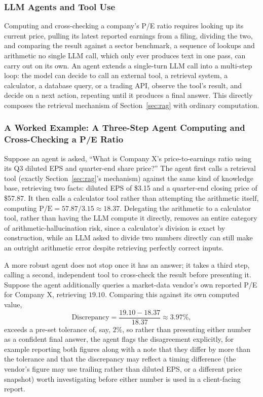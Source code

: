 \documentclass[../ai_in_finance]{subfiles}
\begin{document}
\subsubsection*{LLM Agents and Tool Use}

Computing and cross-checking a company's P/E ratio requires looking up its current price, pulling its latest reported earnings from a filing, dividing the two, and comparing the result against a sector benchmark, a sequence of lookups and arithmetic no single LLM call, which only ever produces text in one pass, can carry out on its own. An agent extends a single-turn LLM call into a multi-step loop: the model can decide to call an external tool, a retrieval system, a calculator, a database query, or a trading API, observe the tool's result, and decide on a next action, repeating until it produces a final answer. This directly composes the retrieval mechanism of Section~\ref{sec:rag} with ordinary computation.

\subsubsection*{A Worked Example: A Three-Step Agent Computing and Cross-Checking a P/E Ratio}
Suppose an agent is asked, ``What is Company X's price-to-earnings ratio using its Q3 diluted EPS and quarter-end share price?'' The agent first calls a retrieval tool (exactly Section~\ref{sec:rag}'s mechanism) against the same kind of knowledge base, retrieving two facts: diluted EPS of \$3.15 and a quarter-end closing price of \$57.87. It then calls a calculator tool rather than attempting the arithmetic itself, computing $\text{P/E} = 57.87 / 3.15 \approx 18.37$. Delegating the arithmetic to a calculator tool, rather than having the LLM compute it directly, removes an entire category of arithmetic-hallucination risk, since a calculator's division is exact by construction, while an LLM asked to divide two numbers directly can still make an outright arithmetic error despite retrieving perfectly correct inputs.

A more robust agent does not stop once it has an answer; it takes a third step, calling a second, independent tool to cross-check the result before presenting it. Suppose the agent additionally queries a market-data vendor's own reported P/E for Company X, retrieving $19.10$. Comparing this against its own computed value,
\begin{equation*}
\text{Discrepancy} = \frac{19.10 - 18.37}{18.37} \approx 3.97\%,
\end{equation*}
exceeds a pre-set tolerance of, say, $2\%$, so rather than presenting either number as a confident final answer, the agent flags the disagreement explicitly, for example reporting both figures along with a note that they differ by more than the tolerance and that the discrepancy may reflect a timing difference (the vendor's figure may use trailing rather than diluted EPS, or a different price snapshot) worth investigating before either number is used in a client-facing report.
\end{document}
